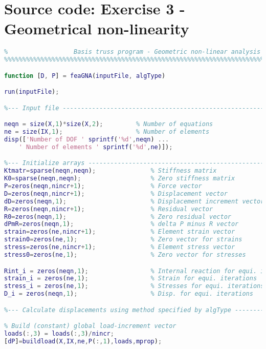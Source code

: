 \chapter{Source code: Exercise 3 - Geometrical non-linearity}
\vspace{2mm}
\begin{lstlisting}[language=Matlab, caption = FE implementation for geometrical non-linearity, label=lst:CodeGNA]
%%%%%%%%%%%%%%%%%%%%%%%%%%%%%%%%%%%%%%%%%%%%%%%%%%%%%%%%%%%%%%%%%%%%%%%%%%%
%                  Basis truss program - Geometric non-linear analysis    %
%%%%%%%%%%%%%%%%%%%%%%%%%%%%%%%%%%%%%%%%%%%%%%%%%%%%%%%%%%%%%%%%%%%%%%%%%%% 

function [D, P] = feaGNA(inputFile, algType)

run(inputFile);

%--- Input file ----------------------------------------------------------%

neqn = size(X,1)*size(X,2);         % Number of equations
ne = size(IX,1);                    % Number of elements
disp(['Number of DOF ' sprintf('%d',neqn) ...
    ' Number of elements ' sprintf('%d',ne)]);

%--- Initialize arrays ---------------------------------------------------%
Ktmatr=sparse(neqn,neqn);               % Stiffness matrix
K0=sparse(neqn,neqn);                   % Zero stiffness matrix
P=zeros(neqn,nincr+1);                  % Force vector
D=zeros(neqn,nincr+1);                  % Displacement vector
dD=zeros(neqn,1);                       % Displacement increment vector
R=zeros(neqn,nincr+1);                  % Residual vector
R0=zeros(neqn,1);                       % Zero residual vector
dPmR=zeros(neqn,1);                     % delta P minus R vector
strain=zeros(ne,nincr+1);               % Element strain vector
strain0=zeros(ne,1);                    % Zero vector for strains
stress=zeros(ne,nincr+1);               % Element stress vector
stress0=zeros(ne,1);                    % Zero vector for stresses

Rint_i = zeros(neqn,1);                 % Internal reaction for equi. iter.
strain_i = zeros(ne,1);                 % Strain for equi. iterations
stress_i = zeros(ne,1);                 % Stresses for equi. iterations
D_i = zeros(neqn,1);                    % Disp. for equi. iterations

%--- Calculate displacements using method specified by algType -----------%

% Build (constant) global load-increment vector
loads(:,3) = loads(:,3)/nincr;
[dP]=buildload(X,IX,ne,P(:,1),loads,mprop);


\end{lstlisting}
